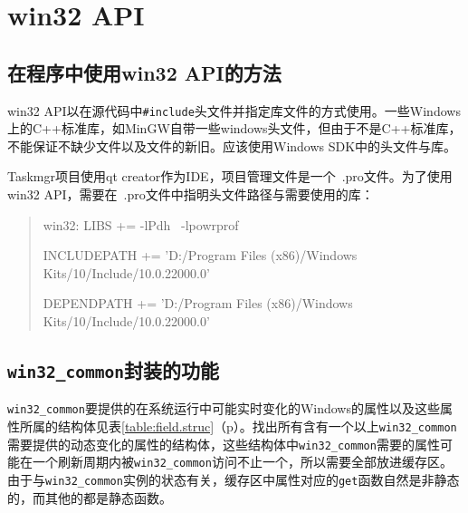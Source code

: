\documentclass[UTF8,twoside,titlepage]{ctexart}
\newcommand\code[1]{\texttt{#1}}
\newcommand\myref[1]{\ref{#1}（p\pageref{#1}）}
\begin{document}
\section{win32 API}
\label{sec:win32api}


\subsection{在程序中使用win32 API的方法}
win32 API以在源代码中\code{\#include}头文件并指定库文件的方式使用。一些Windows上的C++标准库，如MinGW自带一些windows头文件，但由于不是C++标准库，不能保证不缺少文件以及文件的新旧。应该使用Windows SDK中的头文件与库。

Taskmgr项目使用qt creator作为IDE，项目管理文件是一个\ .pro文件。为了使用win32 API，需要在\ .pro文件中指明头文件路径与需要使用的库：

\begin{quote}
\ttfamily
win32: LIBS += -lPdh \
                -lpowrprof

INCLUDEPATH += 'D:/Program Files (x86)/Windows Kits/10/Include/10.0.22000.0'

DEPENDPATH += 'D:/Program Files (x86)/Windows Kits/10/Include/10.0.22000.0'
\end{quote}

\subsection{\code{win32\_common}封装的功能}
\code{win32\_common}要提供的在系统运行中可能实时变化的Windows的属性以及这些属性所属的结构体见表\myref{table:field.struc}。找出所有含有一个以上\code{win32\_common}需要提供的动态变化的属性的结构体，这些结构体中\code{win32\_common}需要的属性可能在一个刷新周期内被\code{win32\_common}访问不止一个，所以需要全部放进缓存区。由于与\code{win32\_common}实例的状态有关，缓存区中属性对应的\code{get}函数自然是非静态的，而其他的都是静态函数。
\end{document}
